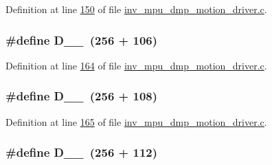 Definition at line \hyperlink{inv__mpu__dmp__motion__driver_8c_source_l00150}{150} of file \hyperlink{inv__mpu__dmp__motion__driver_8c_source}{inv\+\_\+mpu\+\_\+dmp\+\_\+motion\+\_\+driver.\+c}.

\subsubsection[{\texorpdfstring{D\+\_\+1\+\_\+106}{D_1_106}}]{\setlength{\rightskip}{0pt plus 5cm}\#define D\+\_\+\_~(256 + 106)}\hypertarget{group___d_r_i_v_e_r_s_ga1a90f348e71ec52d2ae6af1b56a513e6}{}\label{group___d_r_i_v_e_r_s_ga1a90f348e71ec52d2ae6af1b56a513e6}


Definition at line \hyperlink{inv__mpu__dmp__motion__driver_8c_source_l00164}{164} of file \hyperlink{inv__mpu__dmp__motion__driver_8c_source}{inv\+\_\+mpu\+\_\+dmp\+\_\+motion\+\_\+driver.\+c}.

\subsubsection[{\texorpdfstring{D\+\_\+1\+\_\+108}{D_1_108}}]{\setlength{\rightskip}{0pt plus 5cm}\#define D\+\_\+\_~(256 + 108)}\hypertarget{group___d_r_i_v_e_r_s_ga0443e52a615f3203ebc5ca43189bdcb8}{}\label{group___d_r_i_v_e_r_s_ga0443e52a615f3203ebc5ca43189bdcb8}


Definition at line \hyperlink{inv__mpu__dmp__motion__driver_8c_source_l00165}{165} of file \hyperlink{inv__mpu__dmp__motion__driver_8c_source}{inv\+\_\+mpu\+\_\+dmp\+\_\+motion\+\_\+driver.\+c}.

\subsubsection[{\texorpdfstring{D\+\_\+1\+\_\+112}{D_1_112}}]{\setlength{\rightskip}{0pt plus 5cm}\#define D\+\_\+\_~(256 + 112)}\hypertarget{group___d_r_i_v_e_r_s_ga2c149c0691ea56561d9f3cd0f34bb1d9}{}\label{group___d_r_i_v_e_r_s_ga2c149c0691ea56561d9f3cd0f34bb1d9}


